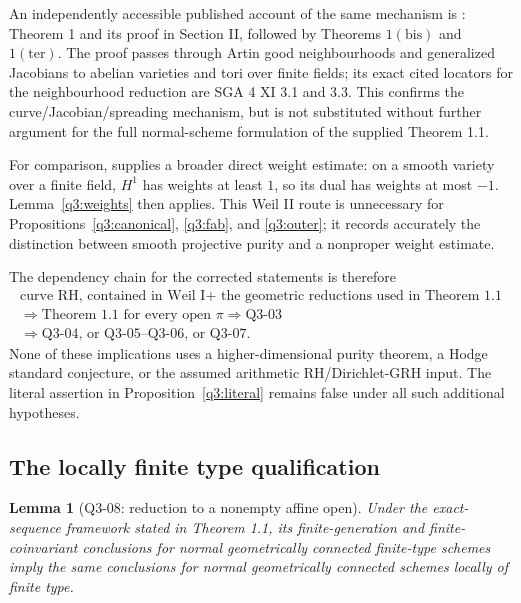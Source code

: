 \documentclass[11pt,a4paper]{article}
\newtheorem{lemma}[theorem]{Lemma}
\theoremstyle{remark}
\begin{document}
An independently accessible published account of the same
mechanism is \cite{KatzLang}: Theorem 1 and its proof in
Section II, followed by Theorems \(1(\mathrm{bis})\) and
\(1(\mathrm{ter})\).  The proof passes through Artin good
neighbourhoods and generalized Jacobians to abelian varieties
and tori over finite fields; its exact cited locators for the
neighbourhood reduction are SGA 4 XI 3.1 and 3.3.  This confirms
the curve/Jacobian/spreading mechanism, but is not substituted
without further argument for the full normal-scheme formulation
of the supplied Theorem 1.1.

For comparison, \cite[(3.3.5), p.~206]{WeilII} supplies a broader
direct weight estimate: on a smooth variety over a finite field,
\(H^1\) has weights at least \(1\), so its dual has weights at
most \(-1\).  Lemma~\ref{q3:weights} then applies.  This Weil II
route is unnecessary for
Propositions~\ref{q3:canonical}, \ref{q3:fab}, and
\ref{q3:outer}; it records accurately the distinction between
smooth projective purity and a nonproper weight estimate.

The dependency chain for the corrected statements is therefore
\[
\begin{gathered}
\text{curve RH, contained in Weil I}
+\text{ the geometric reductions used in Theorem 1.1}\\
\Longrightarrow
\text{Theorem 1.1 for every open }\pi
\Longrightarrow \text{Q3-03}\\
\Longrightarrow
\text{Q3-04, or Q3-05--Q3-06, or Q3-07}.
\end{gathered}
\]
None of these implications uses a higher-dimensional purity
theorem, a Hodge standard conjecture, or the assumed arithmetic
RH/Dirichlet-GRH input.  The literal assertion in
Proposition~\ref{q3:literal} remains false under all such
additional hypotheses.

\subsection{The locally finite type qualification}

\begin{lemma}[Q3-08: reduction to a nonempty affine open]
\label{q3:affine}
Under the exact-sequence framework stated in Theorem 1.1, its
finite-generation and finite-coinvariant conclusions for normal
geometrically connected finite-type schemes imply the same
conclusions for normal geometrically connected schemes locally
of finite type.
\end{lemma}
\end{document}
